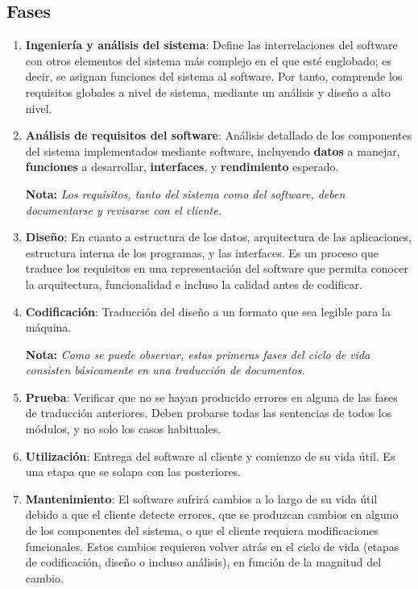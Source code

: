 \subsection{Fases}
\begin{enumerate}

   \item \textbf{Ingeniería y análisis del sistema}: Define las interrelaciones del software con otros elementos del sistema más complejo en el que esté englobado; es decir, se asignan funciones del sistema al software. Por tanto, comprende los requisitos globales a nivel de sistema, mediante un análisis y diseño a alto nivel.

   \item \textbf{Análisis de requisitos del software}: Análisis detallado de los componentes del sistema implementados mediante software, incluyendo \textbf{datos} a manejar, \textbf{funciones} a desarrollar, \textbf{interfaces}, y \textbf{rendimiento} esperado.
   
   \textbf{Nota:} \textit{Los requisitos, tanto del sistema como del software, deben documentarse y revisarse con el cliente.}

   \item \textbf{Diseño}: En cuanto a estructura de los datos, arquitectura de las aplicaciones, estructura interna de los programas, y las interfaces. Es un proceso que traduce los requisitos en una representación del software que permita conocer la arquitectura, funcionalidad e incluso la calidad antes de codificar.

   \item \textbf{Codificación}: Traducción del diseño a un formato que sea legible para la máquina.
   
   \textbf{Nota:} \textit{Como se puede observar, estas primeras fases del ciclo de vida consisten básicamente en una traducción de documentos.}

   \item \textbf{Prueba}: Verificar que no se hayan producido errores en alguna de las fases de traducción anteriores. Deben probarse todas las sentencias de todos los módulos, y no solo los casos habituales.

   \item \textbf{Utilización}: Entrega del software al cliente y comienzo de su vida útil. Es una etapa que se solapa con las posteriores.
   
   \item \textbf{Mantenimiento}: El software sufrirá cambios a lo largo de su vida útil debido a que el cliente detecte errores, que se produzcan cambios en alguno de los componentes del sistema, o que el cliente requiera modificaciones funcionales. Estos cambios requieren volver atrás en el ciclo de vida (etapas de codificación, diseño o incluso análisis), en función de la magnitud del cambio.\\
   

\end{enumerate}

